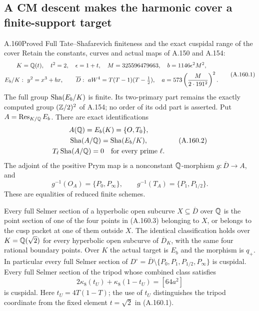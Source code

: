 \subsection{A CM descent makes the harmonic cover a finite-support target}

\begin{statement}{A.160}{Proved}
{Full Tate--Shafarevich finiteness and the exact cuspidal range of the cover}
Retain the constants, curves and actual maps of A.150 and A.154:
\[
 \begin{gathered}
 K=\mathbb Q(t),\quad t^2=2,\quad \epsilon=1+t,\quad
 M=325596479663,\quad b=1146\epsilon^2M^2,\\
 E_b/K:\ y^2=x^3+bx,\qquad
 \overline D:\ aW^4=T(T-1)(T-\tfrac12),\quad
 a=573\left(\frac{M}{2\cdot191^2}\right)^2.
 \end{gathered}
\tag{A.160.1}
\]
The full group \(\operatorname{Sha}(E_b/K)\) is finite.  Its two-primary
part remains the exactly computed group \((\mathbb Z/2)^2\) of
A.154; no order of its odd part is asserted.  Put
\(A=\operatorname{Res}_{K/\mathbb Q}E_b\).  There are exact
identifications
\[
 \begin{gathered}
 A(\mathbb Q)=E_b(K)=\{O,T_0\},\\
 \operatorname{Sha}(A/\mathbb Q)=\operatorname{Sha}(E_b/K),\\
 T_\ell\operatorname{Sha}(A/\mathbb Q)=0\quad\text{for every prime }\ell.
 \end{gathered}
\tag{A.160.2}
\]
The adjoint of the positive Prym map is a nonconstant
\(\mathbb Q\)-morphism \(g:\overline D\to A\), and
\[
 g^{-1}(O_A)=\{P_0,P_\infty\},\qquad
 g^{-1}(T_A)=\{P_1,P_{1/2}\}.
\tag{A.160.3}
\]
These are equalities of reduced finite schemes.

Every full Selmer section of a hyperbolic open subcurve
\(X\subseteq\overline D\) over \(\mathbb Q\) is the point section
of one of the four points in (A.160.3) belonging to \(X\),
or belongs to the cusp packet at one of them outside \(X\).
The identical classification holds over \(K=\mathbb Q(\sqrt2)\)
for every hyperbolic open subcurve of \(\overline D_K\),
with the same four rational boundary points.  Over \(K\)
the actual target is \(E_b\) and the morphism is \(q_+\).
In particular every full Selmer section of
\(D^\circ=\overline D\setminus\{P_0,P_1,P_{1/2},P_\infty\}\)
is cuspidal.  Every full Selmer section of the tripod
whose combined class satisfies
\[
                   2\kappa_8(t_U)+\kappa_8(1-t_U)=[64a^2]
\tag{A.160.4}
\]
is cuspidal.  Here \(t_U=4T(1-T)\); the use of \(t_U\)
distinguishes the tripod coordinate from the fixed element
\(t=\sqrt2\) in (A.160.1).


\end{statement}
